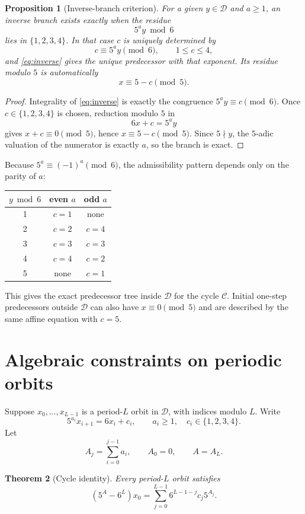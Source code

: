 \documentclass[11pt]{article}
\newtheorem{theorem}{Theorem}[section]
\newtheorem{proposition}[theorem]{Proposition}
\theoremstyle{definition}
\newcommand{\Cyc}{\mathcal{C}}
\newcommand{\D}{\mathcal{D}}
\begin{document}
\begin{proposition}[Inverse-branch criterion]
For a given $y\in\D$ and $a\ge1$, an inverse branch exists exactly when the residue
\[
5^a y\bmod6
\]
lies in $\{1,2,3,4\}$. In that case $c$ is uniquely determined by
\[
c\equiv5^a y\pmod6,\qquad 1\le c\le4,
\]
and \eqref{eq:inverse} gives the unique predecessor with that exponent. Its residue modulo $5$ is automatically
\[
x\equiv5-c\pmod5.
\]
\end{proposition}

\begin{proof}
Integrality of \eqref{eq:inverse} is exactly the congruence $5^a y\equiv c\pmod6$. Once $c\in\{1,2,3,4\}$ is chosen, reduction modulo $5$ in
\[
6x+c=5^a y
\]
gives $x+c\equiv0\pmod5$, hence $x\equiv5-c\pmod5$. Since $5\nmid y$, the $5$-adic valuation of the numerator is exactly $a$, so the branch is exact.
\end{proof}

Because $5^a\equiv(-1)^a\pmod6$, the admissibility pattern depends only on the parity of $a$:
\begin{center}
\begin{tabular}{c|cc}
\toprule
$y\bmod6$ & even $a$ & odd $a$\\
\midrule
1 & $c=1$ & none\\
2 & $c=2$ & $c=4$\\
3 & $c=3$ & $c=3$\\
4 & $c=4$ & $c=2$\\
5 & none & $c=1$\\
\bottomrule
\end{tabular}
\end{center}
This gives the exact predecessor tree inside $\D$ for the cycle $\Cyc$. Initial one-step predecessors outside $\D$ can also have $x\equiv0\pmod5$ and are described by the same affine equation with $c=5$.

\section{Algebraic constraints on periodic orbits}

Suppose $x_0,\ldots,x_{L-1}$ is a period-$L$ orbit in $\D$, with indices modulo $L$. Write
\begin{equation}
5^{a_i}x_{i+1}=6x_i+c_i,
\qquad
a_i\ge1,\quad c_i\in\{1,2,3,4\}.
\label{eq:cyclebranch}
\end{equation}
Let
\[
A_j=\sum_{i=0}^{j-1}a_i,\qquad A_0=0,\qquad A=A_L.
\]

\begin{theorem}[Cycle identity]
Every period-$L$ orbit satisfies
\begin{equation}
\left(5^A-6^L\right)x_0
=
\sum_{j=0}^{L-1}6^{L-1-j}c_j5^{A_j}.
\label{eq:cycleidentity}
\end{equation}
\end{theorem}
\end{document}

